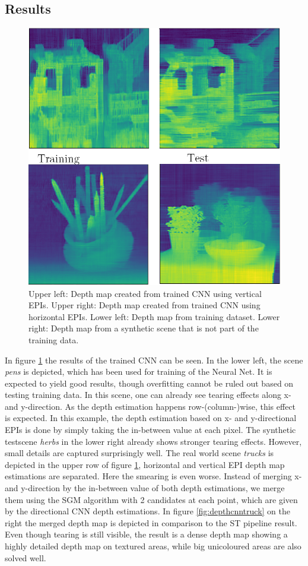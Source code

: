 \documentclass  [
  paper    = a4,
  BCOR     = 10mm,
  twoside,
  fontsize = 12pt,
  fleqn,
  toc      = bibnumbered,
  toc      = listofnumbered,
  numbers  = noendperiod,
  headings = normal,
  listof   = leveldown,
  version  = 3.03
]                                       {scrreprt}
\begin{document}
\begin{appendix}
\section*{Results}
\begin{figure}[h!]
	\centering
	\includegraphics[width=0.7\linewidth]{images/CNN_EPi_images}
	\caption[CNN results]{Upper left: Depth map created from trained CNN using vertical EPIs. Upper right: Depth map created from trained CNN using horizontal EPIs. Lower left: Depth map from training dataset. Lower right: Depth map from a synthetic scene that is not part of the training data.}
	\label{fig:cnnepiimages}
\end{figure}
In figure \ref{fig:cnnepiimages} the results of the trained CNN can be seen. In the lower left, the scene \textit{pens} is depicted, which has been used for training of the Neural Net. It is expected to yield good results, though overfitting cannot be ruled out based on testing training data. In this scene, one can already see tearing effects along x- and y-direction. As the depth estimation happens row-(column-)wise, this effect is expected. In this example, the depth estimation based on x- and y-directional EPIs is done by simply taking the in-between value at each pixel. The synthetic testscene \textit{herbs} in the lower right already shows stronger tearing effects. However, small details are captured surprisingly well. The real world scene \textit{trucks} is depicted in the upper row of figure \ref{fig:cnnepiimages}, horizontal and vertical EPI depth map estimations are separated. Here the smearing is even worse. Instead of merging x- and y-direction by the in-between value of both depth estimations, we merge them using the SGM algorithm with 2 candidates at each point, which are given by the directional CNN depth estimations. In figure \ref{fig:depthcnntruck} on the right the merged depth map is depicted in comparison to the ST pipeline result. Even though tearing is still visible, the result is a dense depth map showing a highly detailed depth map on textured areas, while big unicoloured areas are also solved well.\\

\end{appendix}
\end{document}
